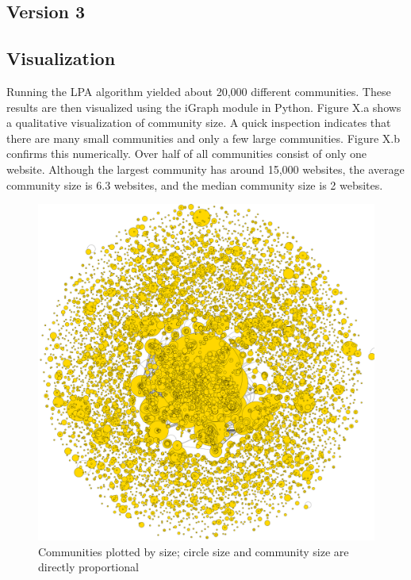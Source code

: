 \documentclass[conference]{IEEEtran}
\begin{document}
\subsection{Version 3}

\subsection{Visualization}

Running the LPA algorithm yielded about 20,000 different communities. These results are then visualized using the iGraph module in Python. Figure X.a shows a qualitative visualization of community size. A quick inspection indicates that there are many small communities and only a few large communities. Figure X.b confirms this numerically. Over half of all communities consist of only one website. Although the largest community has around 15,000 websites, the average community size is 6.3 websites, and the median community size is 2 websites.

\begin{figure}[htbp]
 \centerline{\includegraphics[width=\columnwidth]{communities_by_size.png}}
 \caption{Communities plotted by size; circle size and community size are directly proportional}
\end{figure}
\end{document}

